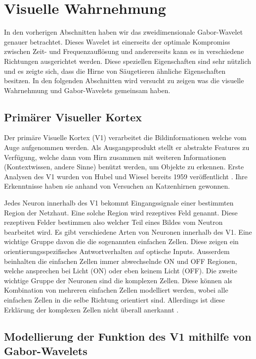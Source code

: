 \section{Visuelle Wahrnehmung}

In den vorherigen Abschnitten haben wir das zweidimensionale Gabor-Wavelet genauer betrachtet.
Dieses Wavelet ist einerseits der optimale Kompromiss zwischen Zeit- und Frequenzauflösung und andererseits kann es in verschiedene Richtungen ausgerichtet werden.
Diese speziellen Eigenschaften sind sehr nützlich und es zeigte sich, dass die Hirne von Säugetieren ähnliche Eigenschaften besitzen.
In den folgenden Abschnitten wird versucht zu zeigen was die visuelle Wahrnehmung und Gabor-Wavelets gemeinsam haben. 

\subsection{Primärer Visueller Kortex}\label{subsec:v1}

Der primäre Visuelle Kortex (V1) verarbeitet die Bildinformationen welche vom Auge aufgenommen werden.
Als Ausgangsprodukt stellt er abstrakte Features zu Verfügung, welche dann vom Hirn zusammen mit weiteren Informationen (Kontextwissen, andere Sinne)  benützt werden, um Objekte zu erkennen.
Erste Analysen des V1 wurden von Hubel und Wiesel bereits 1959 veröffentlicht \cite{paper:hubelwiesel}.
Ihre Erkenntnisse haben sie anhand von Versuchen an Katzenhirnen gewonnen.

Jedes Neuron innerhalb des V1 bekommt Eingangssignale einer bestimmten Region der Netzhaut.
Eine solche Region wird rezeptives Feld genannt.
Diese rezeptiven Felder bestimmen also welcher Teil eines Bildes vom Neutron bearbeitet wird.
Es gibt verschiedene Arten von Neuronen innerhalb des V1.
Eine wichtige Gruppe davon die die sogenannten einfachen Zellen.
Diese zeigen ein orientierungsspezifisches Antwortverhalten auf optische Inputs.
Ausserdem beinhalten die einfachen Zellen immer abwechselnde ON und OFF Regionen, welche ansprechen bei Licht (ON) oder eben keinem Licht (OFF).
Die zweite wichtige Gruppe der Neuronen sind die komplexen Zellen.
Diese können als Kombination von mehreren einfachen Zellen modelliert werden, wobei alle einfachen Zellen in die selbe Richtung orientiert sind.
Allerdings ist diese Erklärung der komplexen Zellen nicht überall anerkannt \cite{book:neuroscience}.


\subsection{Modellierung der Funktion des V1 mithilfe von Gabor-Wavelets}

